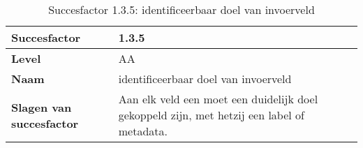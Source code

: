 \newpage
\begin{table}[H]
    \centering
    \caption{Succesfactor 1.3.5: identificeerbaar doel van invoerveld}
    \hspace*{-1cm}\begin{tabular}{|l|p{12cm}|} 
        \hline
        \textbf{Succesfactor}                 & 1.3.5                                                                                                                                                                                                                                                                                                                                                                                                                                                                                                            \\ 
        \hline
        \textbf{Level}                        & AA                                                                                                                                                                                                                                                                                                                                                                                                                                                                                                                 \\ 
        \hline
        \textbf{Naam}                         & identificeerbaar doel van invoerveld~                                                                                                                                                                                                                                                                                                                                                                                                                                                                                      \\ 
        \hline
        \textbf{Slagen van succesfactor}      & Aan elk veld een moet een duidelijk doel gekoppeld zijn, met hetzij een label of metadata.                                                                                                                                                                                                                                                                                             \\ 
        \hline

\end{tabular}
\end{table}
